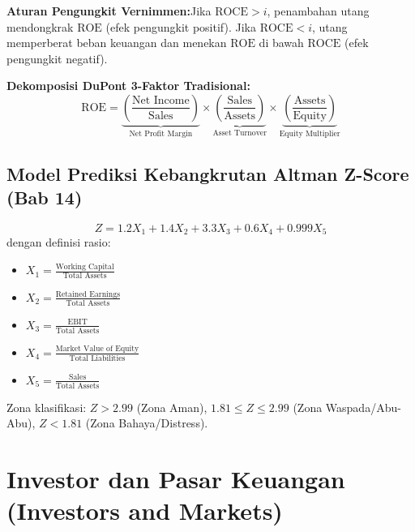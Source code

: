 \documentclass[10pt,a4paper]{article}
\newcommand{\takeaway}[2]{%
  \vspace{6pt}\noindent\colorbox{calloutbg}{%
    \parbox{\dimexpr\textwidth-2\fboxsep\relax}{%
      \vspace{3pt}\textbf{\color{primary}#1:}\hspace{0.5em}#2\vspace{3pt}%
    }%
  }\vspace{6pt}%
}
\begin{document}
\takeaway{Aturan Pengungkit Vernimmen}{Jika $\text{ROCE} > i$, penambahan utang mendongkrak $\text{ROE}$ (efek pengungkit positif). Jika $\text{ROCE} < i$, utang memperberat beban keuangan dan menekan $\text{ROE}$ di bawah $\text{ROCE}$ (efek pengungkit negatif).}

\textbf{Dekomposisi DuPont 3-Faktor Tradisional:}
\begin{equation}
\text{ROE} = \underbrace{\left(\frac{\text{Net Income}}{\text{Sales}}\right)}_{\text{Net Profit Margin}} \times \underbrace{\left(\frac{\text{Sales}}{\text{Assets}}\right)}_{\text{Asset Turnover}} \times \underbrace{\left(\frac{\text{Assets}}{\text{Equity}}\right)}_{\text{Equity Multiplier}}
\end{equation}

\subsection{Model Prediksi Kebangkrutan Altman Z-Score (Bab 14)}

\begin{equation}
Z = 1.2 X_1 + 1.4 X_2 + 3.3 X_3 + 0.6 X_4 + 0.999 X_5
\end{equation}
dengan definisi rasio:
\begin{itemize}
    \setlength{\itemsep}{1pt}\setlength{\parskip}{0pt}
    \item $X_1 = \frac{\text{Working Capital}}{\text{Total Assets}}$
    \item $X_2 = \frac{\text{Retained Earnings}}{\text{Total Assets}}$
    \item $X_3 = \frac{\text{EBIT}}{\text{Total Assets}}$
    \item $X_4 = \frac{\text{Market Value of Equity}}{\text{Total Liabilities}}$
    \item $X_5 = \frac{\text{Sales}}{\text{Total Assets}}$
\end{itemize}
Zona klasifikasi: $Z > 2.99$ (Zona Aman), $1.81 \le Z \le 2.99$ (Zona Waspada/Abu-Abu), $Z < 1.81$ (Zona Bahaya/Distress).

\section{Investor dan Pasar Keuangan (Investors and Markets)}
\end{document}
